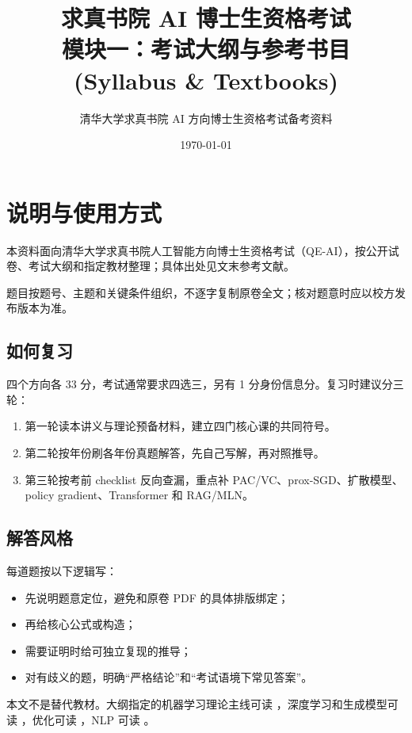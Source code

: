 \documentclass[11pt]{ctexart}
\title{\bfseries 求真书院 AI 博士生资格考试\\模块一：考试大纲与参考书目 (Syllabus \& Textbooks)}
\author{清华大学求真书院 AI 方向博士生资格考试备考资料}
\date{\today}
\begin{document}
\maketitle
\tableofcontents

\section{说明与使用方式}

本资料面向清华大学求真书院人工智能方向博士生资格考试（QE-AI），按公开试卷、考试大纲和指定教材整理；具体出处见文末参考文献。

题目按题号、主题和关键条件组织，不逐字复制原卷全文；核对题意时应以校方发布版本为准。

\subsection{如何复习}

四个方向各 33 分，考试通常要求四选三，另有 1 分身份信息分。复习时建议分三轮：

\begin{enumerate}
  \item 第一轮读本讲义与理论预备材料，建立四门核心课的共同符号。
  \item 第二轮按年份刷各年份真题解答，先自己写解，再对照推导。
  \item 第三轮按考前 checklist 反向查漏，重点补 PAC/VC、prox-SGD、扩散模型、policy gradient、Transformer 和 RAG/MLN。
\end{enumerate}

\subsection{解答风格}

每道题按以下逻辑写：

\begin{itemize}
  \item 先说明题意定位，避免和原卷 PDF 的具体排版绑定；
  \item 再给核心公式或构造；
  \item 需要证明时给可独立复现的推导；
  \item 对有歧义的题，明确“严格结论”和“考试语境下常见答案”。
\end{itemize}

本文不是替代教材。大纲指定的机器学习理论主线可读 \textcite{shalev2014uml,mohri2018foundations}，深度学习和生成模型可读 \textcite{goodfellow2016deep,bishop2023deep,bishop2006prml}，优化可读 \textcite{nesterov2018convex,beck2017first}，NLP 可读 \textcite{jurafsky2026slp,goldberg2017nnnlp}。
\end{document}
